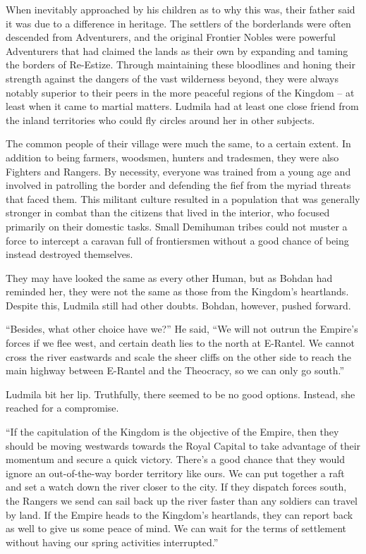  

When inevitably approached by his children as to why this was, their father said it was due to a difference in heritage. The settlers of the borderlands were often descended from Adventurers, and the original Frontier Nobles were powerful Adventurers that had claimed the lands as their own by expanding and taming the borders of Re-Estize. Through maintaining these bloodlines and honing their strength against the dangers of the vast wilderness beyond, they were always notably superior to their peers in the more peaceful regions of the Kingdom – at least when it came to martial matters. Ludmila had at least one close friend from the inland territories who could fly circles around her in other subjects.

 

The common people of their village were much the same, to a certain extent. In addition to being farmers, woodsmen, hunters and tradesmen, they were also Fighters and Rangers. By necessity, everyone was trained from a young age and involved in patrolling the border and defending the fief from the myriad threats that faced them. This militant culture resulted in a population that was generally stronger in combat than the citizens that lived in the interior, who focused primarily on their domestic tasks. Small Demihuman tribes could not muster a force to intercept a caravan full of frontiersmen without a good chance of being instead destroyed themselves.

 

They may have looked the same as every other Human, but as Bohdan had reminded her, they were not the same as those from the Kingdom’s heartlands. Despite this, Ludmila still had other doubts. Bohdan, however, pushed forward.

 

“Besides, what other choice have we?” He said, “We will not outrun the Empire’s forces if we flee west, and certain death lies to the north at E-Rantel. We cannot cross the river eastwards and scale the sheer cliffs on the other side to reach the main highway between E-Rantel and the Theocracy, so we can only go south.”

 

Ludmila bit her lip. Truthfully, there seemed to be no good options. Instead, she reached for a compromise.

 

“If the capitulation of the Kingdom is the objective of the Empire, then they should be moving westwards towards the Royal Capital to take advantage of their momentum and secure a quick victory. There’s a good chance that they would ignore an out-of-the-way border territory like ours. We can put together a raft and set a watch down the river closer to the city. If they dispatch forces south, the Rangers we send can sail back up the river faster than any soldiers can travel by land. If the Empire heads to the Kingdom’s heartlands, they can report back as well to give us some peace of mind. We can wait for the terms of settlement without having our spring activities interrupted.”

